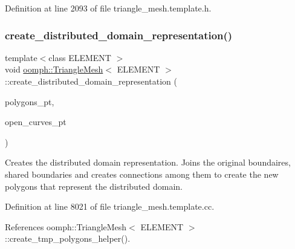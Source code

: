 Definition at line 2093 of file triangle\+\_\+mesh.\+template.\+h.

\mbox{\label{classoomph_1_1TriangleMesh_a36fcc3de82185868d8adb95c73568315}} 
\subsubsection{\texorpdfstring{create\+\_\+distributed\+\_\+domain\+\_\+representation()}{create\_distributed\_domain\_representation()}}
{\footnotesize\ttfamily template$<$class E\+L\+E\+M\+E\+NT $>$ \\
void \hyperlink{classoomph_1_1TriangleMesh}{oomph\+::\+Triangle\+Mesh}$<$ E\+L\+E\+M\+E\+NT $>$\+::create\+\_\+distributed\+\_\+domain\+\_\+representation (\begin{DoxyParamCaption}\item[{Vector$<$ Triangle\+Mesh\+Polygon $\ast$$>$ \&}]{polygons\+\_\+pt,  }\item[{Vector$<$ Triangle\+Mesh\+Open\+Curve $\ast$$>$ \&}]{open\+\_\+curves\+\_\+pt }\end{DoxyParamCaption})\hspace{0.3cm}{\ttfamily [protected]}}



Creates the distributed domain representation. Joins the original boundaires, shared boundaries and creates connections among them to create the new polygons that represent the distributed domain. 



Definition at line 8021 of file triangle\+\_\+mesh.\+template.\+cc.



References oomph\+::\+Triangle\+Mesh$<$ E\+L\+E\+M\+E\+N\+T $>$\+::create\+\_\+tmp\+\_\+polygons\+\_\+helper().

\mbox{\label{classoomph_1_1TriangleMesh_a1589b532530c3a8ddfb88f93b2e832ea}} 
